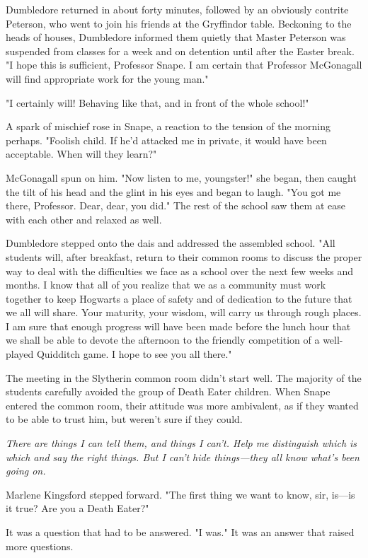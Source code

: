 Dumbledore returned in about forty minutes, followed by an obviously contrite Peterson, who went to join his friends at the Gryffindor table. Beckoning to the heads of houses, Dumbledore informed them quietly that Master Peterson was suspended from classes for a week and on detention until after the Easter break. "I hope this is sufficient, Professor Snape. I am certain that Professor McGonagall will find appropriate work for the young man."

"I certainly will! Behaving like that, and in front of the whole school!"

A spark of mischief rose in Snape, a reaction to the tension of the morning perhaps. "Foolish child. If he'd attacked me in private, it would have been acceptable. When will they learn?"

McGonagall spun on him. "Now listen to me, youngster!" she began, then caught the tilt of his head and the glint in his eyes and began to laugh. "You got me there, Professor. Dear, dear, you did." The rest of the school saw them at ease with each other and relaxed as well.

Dumbledore stepped onto the dais and addressed the assembled school. "All students will, after breakfast, return to their common rooms to discuss the proper way to deal with the difficulties we face as a school over the next few weeks and months. I know that all of you realize that we as a community must work together to keep Hogwarts a place of safety and of dedication to the future that we all will share. Your maturity, your wisdom, will carry us through rough places. I am sure that enough progress will have been made before the lunch hour that we shall be able to devote the afternoon to the friendly competition of a well-played Quidditch game. I hope to see you all there."

The meeting in the Slytherin common room didn't start well. The majority of the students carefully avoided the group of Death Eater children. When Snape entered the common room, their attitude was more ambivalent, as if they wanted to be able to trust him, but weren't sure if they could.

\emph{There are things I can tell them, and things I can't. Help me distinguish which is which and say the right things. But I can't hide things—they all know what's been going on.}

Marlene Kingsford stepped forward. "The first thing we want to know, sir, is—is it true? Are you a Death Eater?"

It was a question that had to be answered. "I was." It was an answer that raised more questions.

